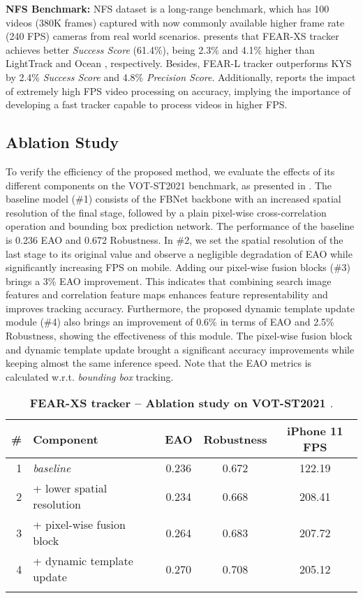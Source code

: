 \documentclass[runningheads]{llncs}
\begin{document}
\textbf{NFS Benchmark:} NFS \cite{nfs} dataset is a long-range benchmark, which has 100 videos (380K frames) captured with now commonly available higher frame rate (240 FPS) cameras from real world scenarios. 
 presents that FEAR-XS tracker achieves better \textit{Success Score} (61.4\%), being 2.3\% and 4.1\% higher than LightTrack \cite{LightTrack} and Ocean \cite{Ocean}, respectively. Besides, FEAR-L tracker outperforms KYS \cite{KYS} by 2.4\% \textit{Success Score} and 4.8\% \textit{Precision Score}. Additionally,  reports the impact of extremely high FPS video processing on accuracy, implying the importance of developing a fast tracker capable to process videos in higher FPS.



\subsection{Ablation Study}\label{section:ablations}

To verify the efficiency of the proposed method, we evaluate the effects of its different components on the VOT-ST2021 \cite{VOT} benchmark, as presented in . 
The baseline model (\#1) consists of the FBNet backbone with an increased spatial resolution of the final stage, followed by a plain pixel-wise cross-correlation operation and bounding box prediction network. 
The performance of the baseline is 0.236 EAO and 0.672 Robustness. In \#2, we set the spatial resolution of the last stage to its original value and observe a negligible degradation of EAO while significantly increasing FPS on mobile. 
Adding our pixel-wise fusion blocks (\#3) brings a 3\% EAO improvement. 
This indicates that combining search image features and correlation feature maps enhances feature representability and improves tracking accuracy. 
Furthermore, the proposed dynamic template update module (\#4) also brings an improvement of 0.6\% in terms of EAO and 2.5\% Robustness, showing the effectiveness of this module. The pixel-wise fusion block and dynamic template update brought a significant accuracy improvements while keeping almost the same inference speed.
Note that the EAO metrics is calculated w.r.t. \textit{bounding box} tracking.

\begin{table}[t!]
\small
\renewcommand{\arraystretch}{0.95}
\centering
\begin{tabular}{r|l|c|c|c}
\noalign{\smallskip}
\# & Component & \quad EAO \quad & Robustness & iPhone 11 FPS\\
\hline
1 & \textit{baseline} & 0.236  & 0.672 & 122.19\\
2 & + lower spatial resolution & 0.234 & 0.668 & 208.41\\
3 & + pixel-wise fusion block & 0.264 & 0.683 & 207.72\\
4 & + dynamic template update & 0.270 & 0.708 & 205.12 \\
\noalign{\smallskip}
\end{tabular}
\caption{ \textbf{FEAR-XS tracker -- Ablation study on VOT-ST2021 \cite{VOT}}.
}
\label{t:ablation}
\end{table}
\end{document}
